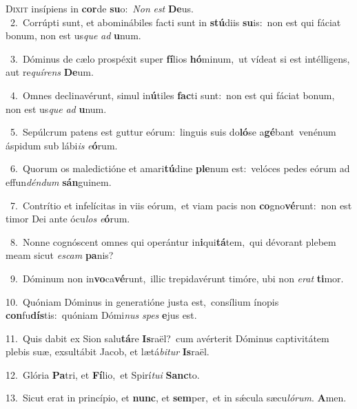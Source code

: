 \lettrine{\initial\textcolor{\initialcolor}{D}}{ixit} insípiens in \textbf{cor}\-de \textbf{su}\-o:~\star \textit{Non} \textit{est} \textbf{De}\-us.\\
{\numbfont\textcolor{\numbcolor}{~2.}}~Corrúpti sunt, et abominábiles facti sunt in \textbf{stú}\-diis \textbf{su}\-is:~\star non est qui fáciat bonum, non est us\textit{que} \textit{ad} \textbf{u}\-num.\par
{\numbfont\textcolor{\numbcolor}{~3.}}~Dóminus de cælo prospéxit super \textbf{fí}\-lios \textbf{hó}\-minum,~\star ut vídeat si est intélligens, aut re\-\textit{quí}\-\textit{rens} \textbf{De}\-um.\par
{\numbfont\textcolor{\numbcolor}{~4.}}~Omnes declinavérunt, simul in\-\textbf{ú}\-tiles \textbf{fac}\-ti sunt:~\star non est qui fáciat bonum, non est us\textit{que} \textit{ad} \textbf{u}\-num.\par
{\numbfont\textcolor{\numbcolor}{~5.}}~Sepúlcrum patens est guttur eórum:~\dagger linguis suis do\-\textbf{ló}\-se a\-\textbf{gé}\-bant~\star venénum áspidum sub lábi\textit{is} \textit{e}\-\textbf{ó}rum.\par
{\numbfont\textcolor{\numbcolor}{~6.}}~Quorum os maledictióne et amari\-\textbf{tú}\-dine \textbf{ple}\-num est:~\star velóces pedes eórum ad effun\-\textit{dén}\-\textit{dum} \textbf{sán}\-guinem.\par
{\numbfont\textcolor{\numbcolor}{~7.}}~Contrítio et infelícitas in viis eórum,~\dagger et viam pacis non \textbf{co}\-gno\-\textbf{vé}\-runt:~\star non est timor Dei ante ócu\textit{los} \textit{e}\-\textbf{ó}rum.\par
{\numbfont\textcolor{\numbcolor}{~8.}}~Nonne cognóscent omnes qui operántur in\-\textbf{i}\-qui\-\textbf{tá}\-tem,~\star qui dévorant plebem meam sicut \textit{es}\-\textit{cam} \textbf{pa}\-nis?\par
{\numbfont\textcolor{\numbcolor}{~9.}}~Dóminum non in\-\textbf{vo}\-ca\-\textbf{vé}\-runt,~\star illic trepidavérunt timóre, ubi non \textit{e}\-\textit{rat} \textbf{ti}\-mor.\par
{\numbfont\textcolor{\numbcolor}{10.}}~Quóniam Dóminus in generatióne justa est,~\dagger consílium ínopis \textbf{con}\-fu\-\textbf{dís}\-tis:~\star quóniam Dómi\textit{nus} \textit{spes} \textbf{e}\-jus est.\par
{\numbfont\textcolor{\numbcolor}{11.}}~Quis dabit ex Sion salu\-\textbf{tá}\-re \textbf{Is}\-raël?~\star cum avérterit Dóminus captivitátem plebis suæ, exsultábit Jacob, et lætá\-\textit{bi}\-\textit{tur} \textbf{Is}\-raël.\par
{\numbfont\textcolor{\numbcolor}{12.}}~Glória \textbf{Pa}\-tri, et \textbf{Fí}\-lio,~\star et Spirí\-\textit{tu}\-\textit{i} \textbf{Sanc}\-to.\par
{\numbfont\textcolor{\numbcolor}{13.}}~Sicut erat in princípio, et \textbf{nunc}\-, et \textbf{sem}\-per,~\star et in sǽcula sæcu\-\textit{ló}\-\textit{rum}. \textbf{A}\-men.\par
